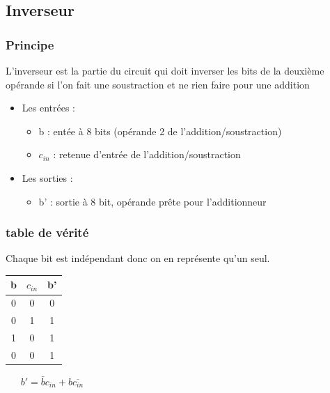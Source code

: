 \documentclass[10pt,a4paper]{article}
\begin{document}
\subsection{Inverseur}
\subsubsection{Principe}
L'inverseur est la partie du circuit qui doit inverser les bits de la deuxième opérande si l'on fait une soustraction et ne rien faire pour une addition

\begin{itemize}
\item 	Les entrées :
		\begin{itemize}
		\item b : entée à 8	bits (opérande 2 de l'addition/soustraction)
		\item $c_{in}$ : retenue d'entrée de l'addition/soustraction
		\end{itemize}
\item 	Les sorties :
		\begin{itemize}
		\item b' : sortie à 8 bit, opérande prête pour l'additionneur
		\end{itemize}
\end{itemize}

\subsubsection{table de vérité}
Chaque bit est indépendant donc on en représente qu'un seul.

\begin{tabular}{cc|c}
b & $c_{in}$ & b' \\ 
\hline 
0 & 0 & 0 \\ 
0 & 1 & 1 \\ 
1 & 0 & 1 \\ 
0 & 0 & 1 \\ 
\end{tabular} 
$\ \ \ \ \ \ \ b' = \bar{b}c_{in} + b\overline{c_{in}}$
\end{document}
